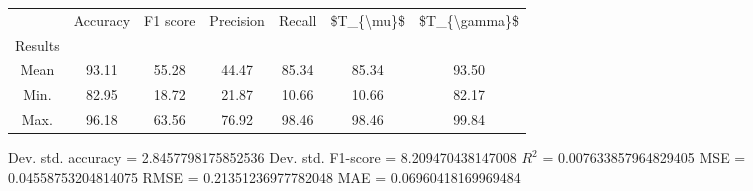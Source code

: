 \begin{tabular}{|c|c|c|c|c|c|c|}
\toprule
{} &  Accuracy &  F1 score &  Precision &  Recall &  \$T\_\{\textbackslash mu\}\$ &  \$T\_\{\textbackslash gamma\}\$ \\
Results &           &           &            &         &            &               \\
\hline
Mean    &     93.11 &     55.28 &      44.47 &   85.34 &      85.34 &         93.50 \\
Min.    &     82.95 &     18.72 &      21.87 &   10.66 &      10.66 &         82.17 \\
Max.    &     96.18 &     63.56 &      76.92 &   98.46 &      98.46 &         99.84 \\
\bottomrule
\end{tabular}

 Dev. std. accuracy = 2.8457798175852536
 Dev. std. F1-score = 8.209470438147008
 $R^2$ = 0.007633857964829405
 MSE = 0.04558753204814075
 RMSE = 0.21351236977782048
 MAE = 0.06960418169969484